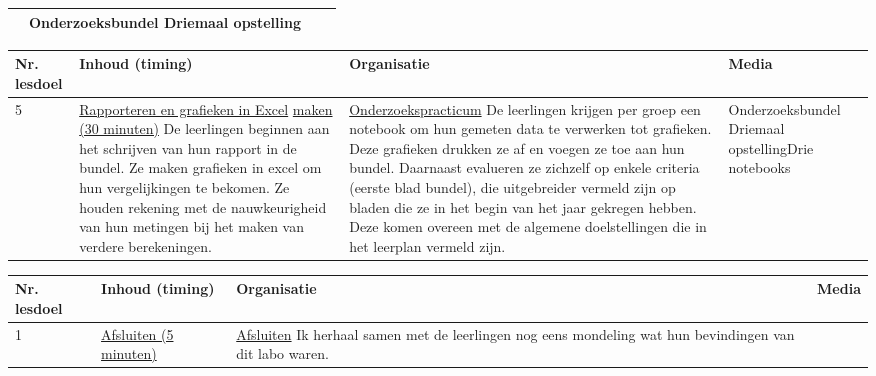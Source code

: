 \begin{landscape}
\begin{tabularx}{1.56\textwidth}{|p{1.5cm}|p{7cm}|X|p{5cm}|}
	& Onderzoeksbundel \newline\newline Driemaal opstelling
	\\ \hline
\end{tabularx}

\begin{tabularx}{1.56\textwidth}{|p{1.5cm}|p{7cm}|X|p{5cm}|}
	\hline
	\textbf{Nr. lesdoel } & \textbf{Inhoud (timing)}  & \textbf{Organisatie } & \textbf{Media } \\ \hline
	5\newline\newline 6\newline\newline 7\newline\newline 8&\underline{Rapporteren en grafieken in Excel} \underline{maken (30 minuten)}\newline
	De leerlingen beginnen aan het schrijven van hun rapport in de bundel. Ze maken grafieken in excel om hun vergelijkingen te bekomen. Ze houden rekening met de nauwkeurigheid van hun metingen bij het maken van verdere berekeningen.
	&  \underline{Onderzoekspracticum}\newline 
	De leerlingen krijgen per groep een notebook om hun gemeten data te verwerken tot grafieken. Deze grafieken drukken ze af en voegen ze toe aan hun bundel. Daarnaast evalueren ze zichzelf op enkele criteria (eerste blad bundel), die uitgebreider vermeld zijn op bladen die ze in het begin van het jaar gekregen hebben. Deze komen overeen met de algemene doelstellingen die in het leerplan vermeld zijn.
	& Onderzoeksbundel \newline\newline Driemaal opstelling\newline\newline Drie notebooks
	\\ \hline
\end{tabularx}
%	
\newline
\newline

\begin{tabularx}{1.56\textwidth}{|p{1.5cm}|p{7cm}|X|p{5cm}|}
	\hline
	\textbf{Nr. lesdoel } & \textbf{Inhoud (timing)}  & \textbf{Organisatie } & \textbf{Media } \\ \hline
	1\newline\newline 5&\underline{Afsluiten (5 minuten)}\newline 
	&  \underline{Afsluiten}\newline
	Ik herhaal samen met de leerlingen nog eens mondeling wat hun bevindingen van dit labo waren.
	& 
	\\ \hline
\end{tabularx}
	
%	
	
	
\end{landscape}


